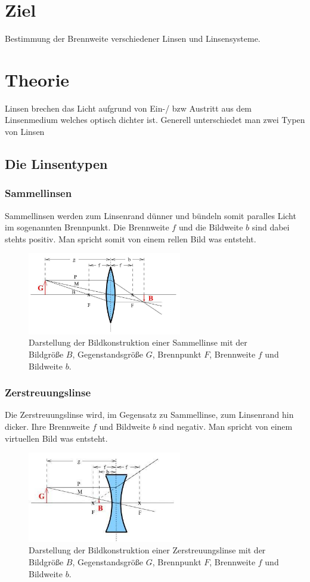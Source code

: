 \section{Ziel}
Bestimmung der Brennweite verschiedener Linsen und Linsensysteme.
\section{Theorie}
Linsen brechen das Licht aufgrund von Ein-/ bzw Austritt aus dem Linsenmedium welches optisch dichter ist.
Generell unterschiedet man zwei Typen von Linsen
\subsection{Die Linsentypen}
\subsubsection*{Sammellinsen}
Sammellinsen werden zum Linsenrand dünner und bündeln somit paralles Licht im sogenannten Brennpunkt.
Die Brennweite $f$ und die Bildweite $b$ sind dabei stehts positiv.
Man spricht somit von einem rellen Bild was entsteht.
\begin{figure}[H]
    \centering
    \includegraphics[width=0.6\textwidth]{bilder/sammellinse.jpg}
    \caption{Darstellung der Bildkonstruktion einer Sammellinse mit der Bildgröße $B$,
    Gegenstandsgröße $G$, Brennpunkt $F$, Brennweite $f$ und Bildweite $b$.\cite[1]{anleitung}}
\end{figure}

\subsubsection*{Zerstreuungslinse}
Die Zerstreuungslinse wird, im Gegensatz zu Sammellinse, zum Linsenrand hin dicker.
Ihre Brennweite $f$ und Bildweite $b$ sind negativ. Man spricht von einem virtuellen Bild was entsteht.
\begin{figure}[H]
    \centering
    \includegraphics[width=0.6\textwidth]{bilder/zerlinse.jpg}
    \caption{Darstellung der Bildkonstruktion einer Zerstreuungslinse mit der Bildgröße $B$,
    Gegenstandsgröße $G$, Brennpunkt $F$, Brennweite $f$ und Bildweite $b$.}
\end{figure}

